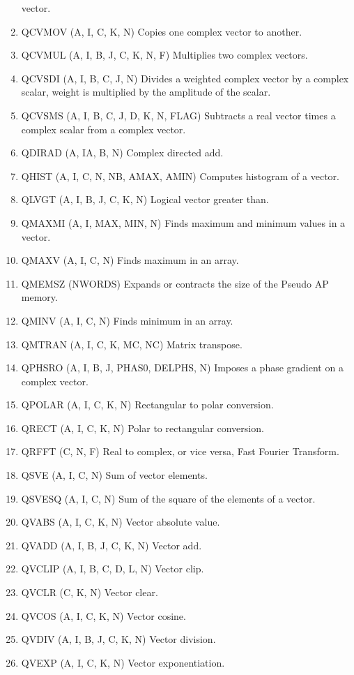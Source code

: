 \begin{enumerate}
vector.
\item QCVMOV  (A, I, C, K, N) Copies one complex vector to another.
\item QCVMUL  (A, I, B, J, C, K, N, F) Multiplies two complex vectors.
\item QCVSDI (A, I, B, C, J, N) Divides a weighted complex vector by a
complex scalar, weight is multiplied by the amplitude of the scalar.
\item QCVSMS (A, I, B, C, J, D, K, N, FLAG) Subtracts a real vector times a
complex scalar from a complex vector.
\item QDIRAD  (A, IA, B, N)  Complex directed add.
\item QHIST (A, I, C, N, NB, AMAX, AMIN) Computes histogram of a vector.
\item QLVGT (A, I, B, J, C, K, N) Logical vector greater than.
\item QMAXMI (A, I, MAX, MIN, N) Finds maximum and minimum values in a
vector.
\item QMAXV  (A, I, C, N) Finds maximum in an array.
\item QMEMSZ (NWORDS) Expands or contracts the size of the Pseudo AP memory.
\item QMINV  (A, I, C, N) Finds minimum in an array.
\item QMTRAN (A, I, C, K, MC, NC) Matrix transpose.
\item QPHSRO (A, I, B, J, PHAS0, DELPHS, N) Imposes a phase gradient on a
complex vector.
\item QPOLAR (A, I, C, K, N) Rectangular to polar conversion.
\item QRECT (A, I, C, K, N) Polar to rectangular conversion.
\item QRFFT (C, N, F) Real to complex, or vice versa, Fast Fourier Transform.
\item QSVE (A, I, C, N) Sum of vector elements.
\item QSVESQ  (A, I, C, N) Sum of the square of the elements of a vector.
\item QVABS  (A, I, C, K, N) Vector absolute value.
\item QVADD (A, I, B, J, C, K, N) Vector add.
\item QVCLIP  (A, I, B, C, D, L, N) Vector clip.
\item QVCLR (C, K, N) Vector clear.
\item QVCOS  (A, I, C, K, N) Vector cosine.
\item QVDIV (A, I, B, J, C, K, N) Vector division.
\item QVEXP (A, I, C, K, N) Vector exponentiation.

\end{enumerate}
